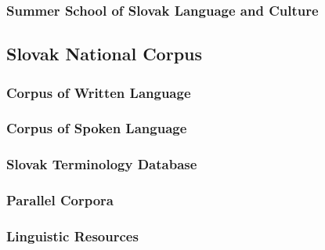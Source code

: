 \documentclass[]{../metanetpaper}
\begin{document}
\begin{multicols}{2}
\subsubsection{Summer School of Slovak Language and Culture}


\subsection{Slovak National Corpus}

\subsubsection{Corpus of Written Language}

\subsubsection{Corpus of Spoken Language}

\subsubsection{Slovak Terminology Database}

\subsubsection{Parallel Corpora}

\subsubsection{Linguistic Resources}


\end{multicols}

\clearpage
\end{document}
